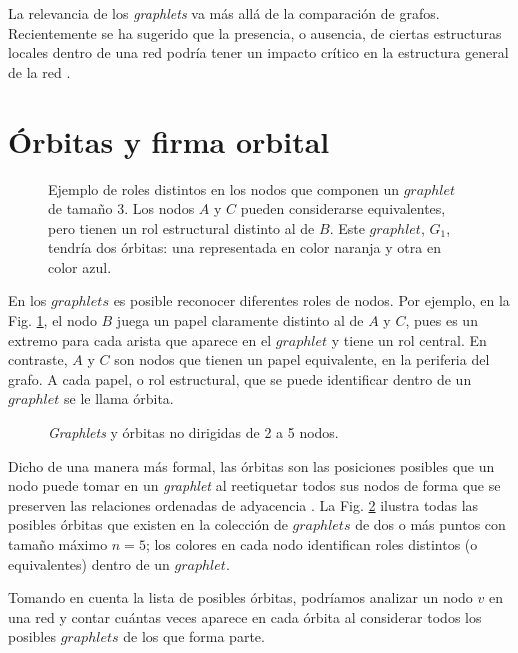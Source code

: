 La relevancia de los \textit{graphlets} va más allá de la comparación de grafos. Recientemente se ha sugerido que la presencia, o ausencia, de ciertas estructuras locales dentro de una red podría tener un impacto crítico en la estructura general de la red \cite{lusher_exponential_nodate}.




\section{Órbitas y firma orbital}
\begin{figure}[htbp]
   \centering
   
    \caption{Ejemplo de roles distintos en los nodos que componen un $graphlet$ de tamaño 3. Los nodos $A$ y $C$ pueden considerarse equivalentes, pero tienen un rol estructural distinto al de $B$. Este $graphlet$, $G_1$, tendría dos órbitas: una representada en color naranja y otra en color azul.}
    \label{fig:ejemploOrbita}
\end{figure}

 
En los $graphlets$ es posible reconocer diferentes roles de nodos. Por ejemplo, en la Fig. \ref{fig:ejemploOrbita}, el nodo $B$ juega un papel claramente distinto al de $A$ y $C$, pues es un extremo para cada arista que aparece en el $graphlet$ y tiene un rol central. En contraste, $A$ y $C$ son nodos que tienen un papel equivalente, en la periferia del grafo. A cada papel, o rol estructural, que se puede identificar dentro de un $graphlet$ se le llama órbita.


\begin{figure}[htbp]
   \centering
   
    \caption{\textit{Graphlets} y órbitas no dirigidas de 2 a 5 nodos.}
    \label{fig:orcaorbits}
\end{figure}

Dicho de una manera más formal, las órbitas son las posiciones posibles que un nodo puede tomar en un \textit{graphlet} al reetiquetar todos sus nodos de forma que se preserven las relaciones ordenadas de adyacencia  \cite{sarajlic_graphlet-based_2016}. La Fig. \ref{fig:orcaorbits} ilustra todas las posibles órbitas que existen en la colección de $graphlets$ de dos o más puntos con tamaño máximo $n=5$; los colores en cada nodo identifican roles distintos (o equivalentes) dentro de un $graphlet$. 

Tomando en cuenta la lista de posibles órbitas, podríamos analizar un nodo $v$ en una red y contar cuántas veces aparece en cada órbita al considerar todos los posibles $graphlets$ de los que forma parte. 

